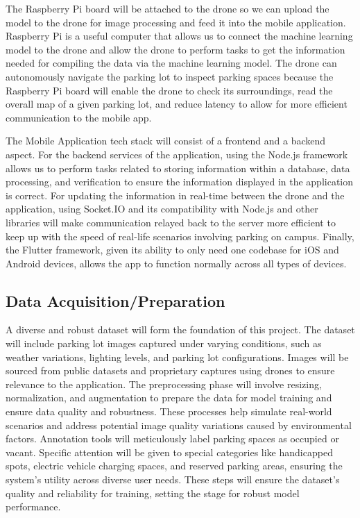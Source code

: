 \documentclass[conference]{IEEEtran}
\begin{document}
The Raspberry Pi board will be attached to the drone so we can upload the model to the drone for image processing and feed it into the mobile application. 
Raspberry Pi is a useful computer that allows us to connect the machine learning model to the drone and allow the drone to perform tasks to get the information needed for compiling the data via the machine learning model. 
The drone can autonomously navigate the parking lot to inspect parking spaces because the Raspberry Pi board will enable the drone to check its surroundings, 
read the overall map of a given parking lot, 
and reduce latency to allow for more efficient communication to the mobile app.

The Mobile Application tech stack will consist of a frontend and a backend aspect. 
For the backend services of the application, 
using the Node.js framework allows us to perform tasks related to storing information within a database, 
data processing, 
and verification to ensure the information displayed in the application is correct. 
For updating the information in real-time between the drone and the application, 
using Socket.IO and its compatibility with Node.js and other libraries will make communication relayed back to the server more efficient to keep up with the speed of real-life scenarios involving parking on campus. 
Finally, 
the Flutter framework, 
given its ability to only need one codebase for iOS and Android devices, 
allows the app to function normally across all types of devices. 



\subsection{Data Acquisition/Preparation}

A diverse and robust dataset will form the foundation of this project. 
The dataset will include parking lot images captured under varying conditions, 
such as weather variations, 
lighting levels, 
and parking lot configurations. 
Images will be sourced from public datasets and proprietary captures using drones to ensure relevance to the application. 
The preprocessing phase will involve resizing, 
normalization, 
and augmentation to prepare the data for model training and ensure data quality and robustness. 
These processes help simulate real-world scenarios and address potential image quality variations caused by environmental factors. 
Annotation tools will meticulously label parking spaces as occupied or vacant. 
Specific attention will be given to special categories like handicapped spots, 
electric vehicle charging spaces, 
and reserved parking areas, 
ensuring the system’s utility across diverse user needs. 
These steps will ensure the dataset’s quality and reliability for training, 
setting the stage for robust model performance.
\end{document}
